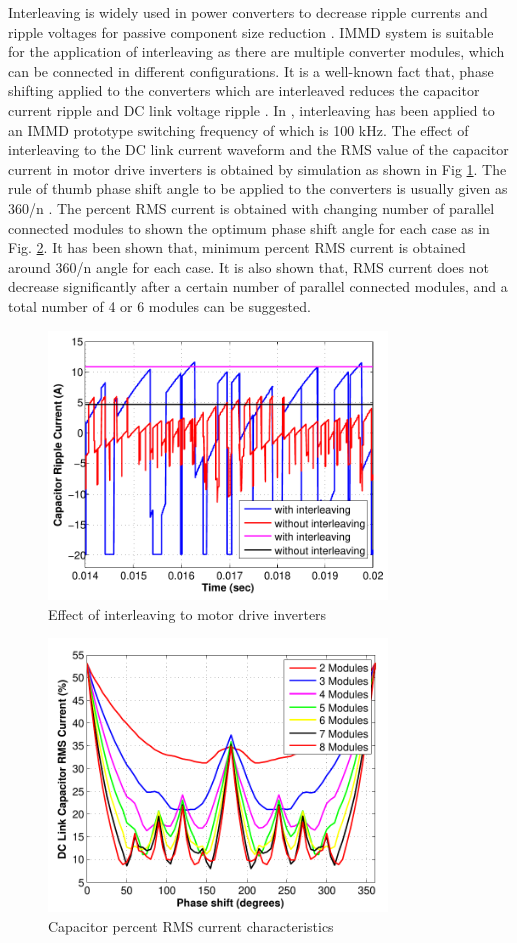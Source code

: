 \documentclass[conference,a4paper,twocolumn]{IEEEtran}
\begin{document}
Interleaving is widely used in power converters to decrease ripple currents and ripple voltages for passive component size reduction \cite{Zhang2010}. IMMD system is suitable for the application of interleaving as there are multiple converter modules, which can be connected in different configurations. It is a well-known fact that, phase shifting applied to the converters which are interleaved reduces the capacitor current ripple and DC link voltage ripple \cite{LoCalzo2016,Wang2015,Su2010}. In \cite{Wang2015}, interleaving has been applied to an IMMD prototype switching frequency of which is 100 kHz. The effect of interleaving to the DC link current waveform and the RMS value of the capacitor current in motor drive inverters is obtained by simulation as shown in Fig \ref{fig4}.
The rule of thumb phase shift angle to be applied to the converters is usually given as 360/n \cite{LoCalzo2016}. The percent RMS current is obtained with changing number of parallel connected modules to shown the optimum phase shift angle for each case as in Fig. \ref{fig5}. It has been shown that, minimum percent RMS current is obtained around 360/n angle for each case. It is also shown that, RMS current does not decrease significantly after a certain number of parallel connected modules, and a total number of 4 or 6 modules can be suggested.


\begin{figure}[h]
  \centering
  \includegraphics[width=9cm]{fig4_2}
  \caption{Effect of interleaving to motor drive inverters}
  \label{fig4}
\end{figure}


\begin{figure}[h]
  \centering
  \includegraphics[width=9cm]{fig5_2}
  \caption{Capacitor percent RMS current characteristics}
  \label{fig5}
\end{figure}
\end{document}

